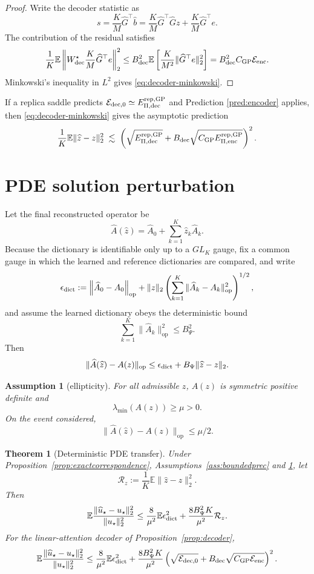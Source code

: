 \documentclass[11pt,a4paper]{article}
\newtheorem{assumption}{Assumption}
\newtheorem{theorem}{Theorem}
\theoremstyle{definition}
\newcommand{\E}{\mathbb E}
\newcommand{\op}{\mathrm{op}}
\newcommand{\wh}{\widehat}
\newcommand{\calE}{\mathcal E}
\begin{document}
\begin{proof}
Write the decoder statistic as
\[
    s
    =
    \frac{K}{M}\wh G^\top\wh b
    =
    \frac{K}{M}\wh G^\top\wh Gz
    +
    \frac{K}{M}\wh G^\top e .
\]
The contribution of the residual satisfies
\[
    \frac1K\E\left\|
    W_{\rm dec}^\star\frac{K}{M}\wh G^\top e
    \right\|_2^2
    \le
    B_{\rm dec}^2
    \E\left[
        \frac{K}{M^2}\|\wh G^\top e\|_2^2
    \right]
    =
    B_{\rm dec}^2 C_{\rm GP}\calE_{\rm enc}.
\]
Minkowski's inequality in \(L^2\) gives
\eqref{eq:decoder-minkowski}.
\end{proof}

If a replica saddle predicts
\(\calE_{\rm dec,0}\simeq E_{\Pi,\rm dec}^{\rm rep,GP}\) and Prediction
\ref{pred:encoder} applies, then \eqref{eq:decoder-minkowski} gives the
asymptotic prediction
\[
    \frac1K\E\|\wh z-z\|_2^2
    \;\lesssim\;
    \left(
      \sqrt{E_{\Pi,\rm dec}^{\rm rep,GP}}
      +B_{\rm dec}\sqrt{C_{\rm GP}E_{\Pi,\rm enc}^{\rm rep,GP}}
    \right)^2.
\]

\section{PDE solution perturbation}

Let the final reconstructed operator be
\[
    \wh A(\wh z)=\wh A_0+\sum_{k=1}^{K}\wh z_k\wh A_k.
\]
Because the dictionary is identifiable only up to a $GL_K$ gauge, fix a
common gauge in which the learned and reference dictionaries are compared,
and write
\[
    \epsilon_{\rm dict}
    :=
    \left\|
    \wh A_0-A_0
    \right\|_{\op}
    +
    \|z\|_2
    \left(
    \sum_{k=1}^{K}\|\wh A_k-A_k\|_{\op}^2
    \right)^{1/2},
\]
and assume the learned dictionary obeys the deterministic bound
\[
    \sum_{k=1}^{K}\|\wh A_k\|_{\op}^2\le B_\Psi^2 .
\]
Then
\[
    \|\wh A(\wh z)-A(z)\|_{\op}
    \le
    \epsilon_{\rm dict}
    +
    B_\Psi\|\wh z-z\|_2 .
\]

\begin{assumption}[ellipticity]
\label{ass:elliptic}
For all admissible $z$, $A(z)$ is symmetric positive definite and
\[
    \lambda_{\min}(A(z))\ge\mu>0.
\]
On the event considered,
\[
    \|\wh A(\wh z)-A(z)\|_{\op}\le\mu/2 .
\]
\end{assumption}

\begin{theorem}[Deterministic PDE transfer]
\label{thm:endtoend}
Under Proposition~\ref{prop:exactcorrespondence},
Assumptions~\ref{ass:boundedprec} and \ref{ass:elliptic}, let
\[
    \mathcal R_z:=\frac1K\E\|\wh z-z\|_2^2.
\]
Then
\[
    \E\frac{\|\wh u_\star-u_\star\|_2^2}{\|u_\star\|_2^2}
    \le
    \frac{8}{\mu^2}
    \E\epsilon_{\rm dict}^2
    +
    \frac{8B_\Psi^2K}{\mu^2}\mathcal R_z.
\]
For the linear-attention decoder of Proposition~\ref{prop:decoder},
\[
    \E\frac{\|\wh u_\star-u_\star\|_2^2}{\|u_\star\|_2^2}
    \le
    \frac{8}{\mu^2}\E\epsilon_{\rm dict}^2
    +\frac{8B_\Psi^2K}{\mu^2}
    \left(
      \sqrt{\calE_{\rm dec,0}}
      +B_{\rm dec}\sqrt{C_{\rm GP}\calE_{\rm enc}}
    \right)^2.
\]
\end{theorem}
\end{document}
